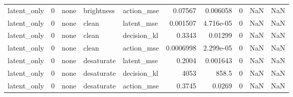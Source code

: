 \begin{tabular}{lrlllrrrrr}
latent\_only & 0 & none & brightness & action\_mse & 0.07567 & 0.006058 & 0 & NaN & NaN \\
latent\_only & 0 & none & clean & latent\_mse & 0.001507 & 4.716e-05 & 0 & NaN & NaN \\
latent\_only & 0 & none & clean & decision\_kl & 0.3343 & 0.01299 & 0 & NaN & NaN \\
latent\_only & 0 & none & clean & action\_mse & 0.0006998 & 2.299e-05 & 0 & NaN & NaN \\
latent\_only & 0 & none & desaturate & latent\_mse & 0.2004 & 0.001643 & 0 & NaN & NaN \\
latent\_only & 0 & none & desaturate & decision\_kl & 4053 & 858.5 & 0 & NaN & NaN \\
latent\_only & 0 & none & desaturate & action\_mse & 0.3745 & 0.0269 & 0 & NaN & NaN \\
\bottomrule
\end{tabular}

